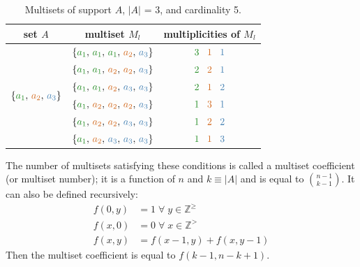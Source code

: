 \documentclass[12pt]{article}
\begin{document}
\begin{table}
  \centering
  \begin{tabular}{| c | c | c |}
    \hline
    \rowcolor{bg} set $A$ & multiset $M_l$ & multiplicities of $M_l$          \\
    \hline
    \multirow{6}{*}{$\{{\color{c1}a_1}, \, {\color{c2}a_2}, \, 
                       {\color{c3}a_3}\}$} 
    & $\{{\color{c1}a_1}, \, {\color{c1}a_1}, \, {\color{c1}a_1}, \, 
         {\color{c2}a_2}, \, {\color{c3}a_3}\}$ 
    & ${\color{c1}3} \;\;\; {\color{c2}1} \;\;\; {\color{c3}1}$               \\
    & $\{{\color{c1}a_1}, \, {\color{c1}a_1}, \, {\color{c2}a_2}, \,
         {\color{c2}a_2}, \, {\color{c3}a_3}\}$ 
    & ${\color{c1}2} \;\;\; {\color{c2}2} \;\;\; {\color{c3}1}$               \\         & $\{{\color{c1}a_1}, \, {\color{c1}a_1}, \, {\color{c2}a_2}, \, 
         {\color{c3}a_3}, \, {\color{c3}a_3}\}$ 
    & ${\color{c1}2} \;\;\; {\color{c2}1} \;\;\; {\color{c3}2}$               \\         & $\{{\color{c1}a_1}, \, {\color{c2}a_2}, \, {\color{c2}a_2}, \, 
         {\color{c2}a_2}, \, {\color{c3}a_3}\}$ 
    & ${\color{c1}1} \;\;\; {\color{c2}3} \;\;\; {\color{c3}1}$               \\
    & $\{{\color{c1}a_1}, \, {\color{c2}a_2}, \, {\color{c2}a_2}, \, 
         {\color{c3}a_3}, \, {\color{c3}a_3}\}$ 
    & ${\color{c1}1} \;\;\; {\color{c2}2} \;\;\; {\color{c3}2}$               \\
    & $\{{\color{c1}a_1}, \, {\color{c2}a_2}, \, {\color{c3}a_3}, \, 
         {\color{c3}a_3}, \, {\color{c3}a_3}\}$ 
    & ${\color{c1}1} \;\;\; {\color{c2}1} \;\;\; {\color{c3}3}$               \\    
    \hline
  \end{tabular}
  \caption{Multisets of support $A$, $|A|$ = 3, and cardinality 5.}
  \label{tab:ex1}
\end{table}  

The number of multisets satisfying these conditions is called a multiset coefficient (or multiset number); it is a function of $n$ and $k \equiv |A|$ and is equal to $\binom{n - 1}{k - 1}$. It can also be defined recursively:
\begin{align*}
  f(0, y) &= 1 \; \forall \; y \in \mathbb{Z}^{\geqslant} \\
  f(x, 0) &= 0 \; \forall \; x \in \mathbb{Z}^{>} \\
  f(x, y) &= f(x - 1, y) + f(x, y - 1)
\end{align*}
Then the multiset coefficient is equal to $f(k - 1, n - k + 1)$. 
\end{document}

